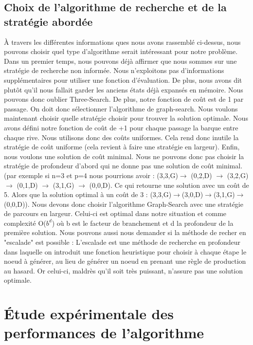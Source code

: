 \documentclass[a4paper, 12pt, french, oneside]{book}
\begin{document}
\section{Choix de l'algorithme de recherche et de la stratégie abordée}
À travers les différentes informations ques nous avons rassemblé ci-dessus, nous pouvons choisir quel type d'algorithme serait intéressant pour notre problème. Dans un premier temps, nous pouvons déjà affirmer que nous sommes sur une stratégie de recherche non informée. Nous n'exploitons pas d'informations supplémentaires pour utiliser une fonction d'évaluation. De plus, nous avons dit plutôt qu'il nous fallait garder les anciens états déjà expansés en mémoire. Nous pouvons donc oublier Three-Search. De plus, notre fonction de coût est de 1 par passage. On doit donc sélectionner l'algorithme de graph-search. Nous voulons maintenant choisir quelle stratégie choisir pour trouver la solution optimale. Nous avons défini notre fonction de coût de +1 pour chaque passage la barque entre chaque rive. Nous utilisons donc des coûts uniformes. Cela rend donc inutile la stratégie de coût uniforme (cela revient à faire une stratégie en largeur). Enfin, nous voulons une solution de coût minimal. Nous ne pouvons donc pas choisir la stratégie de profondeur d'abord qui ne donne pas une solution de coût minimal.(par exemple si n=3 et p=4 nous pourrions avoir : (3,3,G)$\rightarrow$ (0,2,D) $\rightarrow$ (3,2,G) $\rightarrow$ (0,1,D) $\rightarrow$ (3,1,G) $\rightarrow$ (0,0,D). Ce qui retourne une solution avec un coût de 5. Alors que la solution optimal à un coût de 3 : (3,3,G)$\rightarrow$(3,0,D)$\rightarrow$(3,1,G)$\rightarrow$(0,0,D)). Nous devons donc choisir l'algorithme Graph-Search avec une stratégie de parcours en largeur. Celui-ci est optimal dans notre situation et comme complexité O($b^d$) où b est le facteur de branchement et d la profondeur de la première solution. Nous pouvons aussi nous demander si la méthode de recher en "escalade" est possible : L’escalade est une méthode de recherche en profondeur dans laquelle on introduit une fonction heuristique pour choisir à chaque étape le noeud à générer, au lieu de générer un noeud en prenant une règle de production au hasard. Or celui-ci, maldrès qu'il soit très puissant, n'assure pas une solution optimale.

\chapter{Étude expérimentale des performances de l'algorithme}
\end{document}
